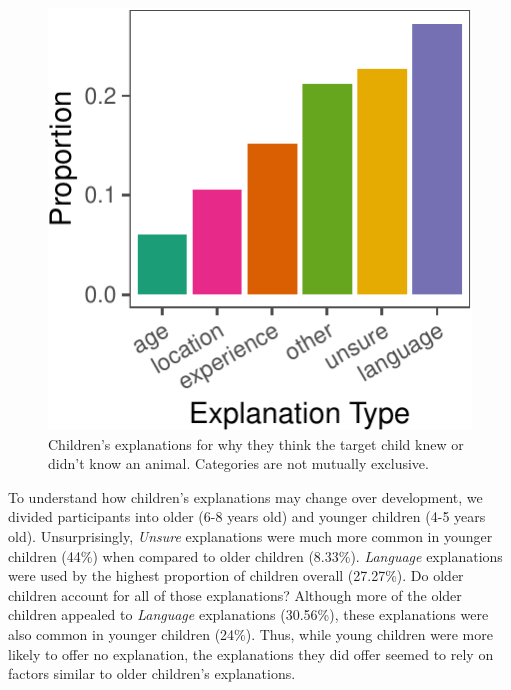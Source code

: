 \documentclass[10pt, letterpaper]{article}
\newenvironment{CodeChunk}{}{}
\begin{document}
\begin{CodeChunk}
\begin{figure}[tb]
\includegraphics{figs/explanations-1} \caption[Children's explanations for why they think the target child knew or didn't know an animal]{Children's explanations for why they think the target child knew or didn't know an animal. Categories are not mutually exclusive.}\label{fig:explanations}
\end{figure}
\end{CodeChunk}

To understand how children's explanations may change over development,
we divided participants into older (6-8 years old) and younger children
(4-5 years old). Unsurprisingly, \emph{Unsure} explanations were much
more common in younger children (44\%) when compared to older children
(8.33\%). \emph{Language} explanations were used by the highest
proportion of children overall (27.27\%). Do older children account for
all of those explanations? Although more of the older children appealed
to \emph{Language} explanations (30.56\%), these explanations were also
common in younger children (24\%). Thus, while young children were more
likely to offer no explanation, the explanations they did offer seemed
to rely on factors similar to older children's explanations.
\end{document}
